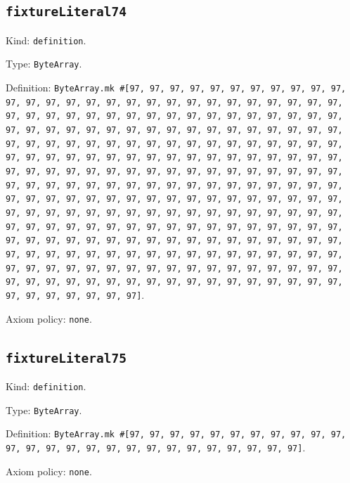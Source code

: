\documentclass[11pt]{article}
\begin{document}
\subsection*{\texttt{fixtureLiteral74}}
\noindent Kind: \texttt{definition}.\par
\noindent Type: \texttt{ByteArray}.\par
\noindent Definition: \texttt{ByteArray.mk \#[97, 97, 97, 97, 97, 97, 97, 97, 97, 97, 97, 97, 97, 97, 97, 97, 97, 97, 97, 97, 97, 97, 97, 97, 97, 97, 97, 97, 97, 97, 97, 97, 97, 97, 97, 97, 97, 97, 97, 97, 97, 97, 97, 97, 97, 97, 97, 97, 97, 97, 97, 97, 97, 97, 97, 97, 97, 97, 97, 97, 97, 97, 97, 97, 97, 97, 97, 97, 97, 97, 97, 97, 97, 97, 97, 97, 97, 97, 97, 97, 97, 97, 97, 97, 97, 97, 97, 97, 97, 97, 97, 97, 97, 97, 97, 97, 97, 97, 97, 97, 97, 97, 97, 97, 97, 97, 97, 97, 97, 97, 97, 97, 97, 97, 97, 97, 97, 97, 97, 97, 97, 97, 97, 97, 97, 97, 97, 97, 97, 97, 97, 97, 97, 97, 97, 97, 97, 97, 97, 97, 97, 97, 97, 97, 97, 97, 97, 97, 97, 97, 97, 97, 97, 97, 97, 97, 97, 97, 97, 97, 97, 97, 97, 97, 97, 97, 97, 97, 97, 97, 97, 97, 97, 97, 97, 97, 97, 97, 97, 97, 97, 97, 97, 97, 97, 97, 97, 97, 97, 97, 97, 97, 97, 97, 97, 97, 97, 97, 97, 97, 97, 97, 97, 97, 97, 97, 97, 97, 97, 97, 97, 97, 97, 97, 97, 97, 97, 97, 97, 97, 97, 97, 97, 97, 97, 97, 97, 97, 97, 97, 97, 97, 97, 97, 97, 97, 97, 97, 97, 97, 97, 97, 97, 97, 97, 97, 97, 97, 97, 97, 97, 97, 97, 97, 97, 97]}.\par
\noindent Axiom policy: \texttt{none}.\par
\subsection*{\texttt{fixtureLiteral75}}
\noindent Kind: \texttt{definition}.\par
\noindent Type: \texttt{ByteArray}.\par
\noindent Definition: \texttt{ByteArray.mk \#[97, 97, 97, 97, 97, 97, 97, 97, 97, 97, 97, 97, 97, 97, 97, 97, 97, 97, 97, 97, 97, 97, 97, 97, 97, 97]}.\par
\noindent Axiom policy: \texttt{none}.\par
\end{document}
